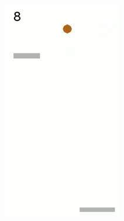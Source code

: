 \begin{figure}[h]
\begin{subfigure}[b]{0.18\textwidth}
		\includegraphics[width=\textwidth]{images/breakout-33-rl-tb-4.png}
	\end{subfigure}
	\begin{subfigure}[b]{0.18\textwidth}

\end{subfigure}
\end{figure}
